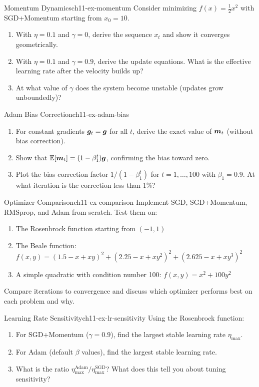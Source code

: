 \documentclass[../../main.tex]{subfiles}
\begin{document}
\begin{exercise}{Momentum Dynamics}{ch11-ex-momentum}
Consider minimizing $f(x) = \frac{1}{2}x^2$ with SGD+Momentum starting from $x_0 = 10$.
\begin{enumerate}[label=(\alph*)]
    \item With $\eta = 0.1$ and $\gamma = 0$, derive the sequence $x_t$ and show it converges geometrically.
    \item With $\eta = 0.1$ and $\gamma = 0.9$, derive the update equations. What is the effective learning rate after the velocity builds up?
    \item At what value of $\gamma$ does the system become unstable (updates grow unboundedly)?
\end{enumerate}
\end{exercise}

\begin{exercise}{Adam Bias Correction}{ch11-ex-adam-bias}
\begin{enumerate}[label=(\alph*)]
    \item For constant gradients $\boldsymbol{g}_t = \boldsymbol{g}$ for all $t$, derive the exact value of $\boldsymbol{m}_t$ (without bias correction).
    \item Show that $\operatorname{\mathbb{E}}[\boldsymbol{m}_t] = (1 - \beta_1^t) \boldsymbol{g}$, confirming the bias toward zero.
    \item Plot the bias correction factor $1/(1-\beta_1^t)$ for $t = 1, \ldots, 100$ with $\beta_1 = 0.9$. At what iteration is the correction less than 1\%?
\end{enumerate}
\end{exercise}

\begin{exercise}{Optimizer Comparison}{ch11-ex-comparison}
Implement SGD, SGD+Momentum, RMSprop, and Adam from scratch. Test them on:
\begin{enumerate}[label=(\alph*)]
    \item The Rosenbrock function starting from $(-1, 1)$
    \item The Beale function: $f(x,y) = (1.5 - x + xy)^2 + (2.25 - x + xy^2)^2 + (2.625 - x + xy^3)^2$
    \item A simple quadratic with condition number 100: $f(x,y) = x^2 + 100y^2$
\end{enumerate}
Compare iterations to convergence and discuss which optimizer performs best on each problem and why.
\end{exercise}

\begin{exercise}{Learning Rate Sensitivity}{ch11-ex-lr-sensitivity}
Using the Rosenbrock function:
\begin{enumerate}[label=(\alph*)]
    \item For SGD+Momentum ($\gamma = 0.9$), find the largest stable learning rate $\eta_{\max}$.
    \item For Adam (default $\beta$ values), find the largest stable learning rate.
    \item What is the ratio $\eta_{\max}^{\text{Adam}} / \eta_{\max}^{\text{SGD}}$? What does this tell you about tuning sensitivity?
\end{enumerate}
\end{exercise}
\end{document}
